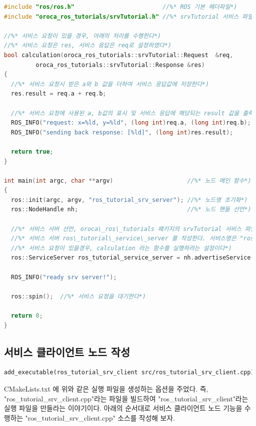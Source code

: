\begin{lstlisting}[language=C++]
#include "ros/ros.h"                         //%* ROS 기본 헤더파일*)
#include "oroca_ros_tutorials/srvTutorial.h" //%* srvTutorial 서비스 파일 헤더*)

//%* 서비스 요청이 있을 경우, 아래의 처리를 수행한다*)
//%* 서비스 요청은 res, 서비스 응답은 req로 설정하였다*)
bool calculation(oroca_ros_tutorials::srvTutorial::Request  &req,
         oroca_ros_tutorials::srvTutorial::Response &res)
{
  //%* 서비스 요청시 받은 a와 b 값을 더하여 서비스 응답값에 저장한다*)
  res.result = req.a + req.b;  

  //%* 서비스 요청에 사용된 a, b값의 표시 및 서비스 응답에 해당되는 result 값을 출력한다*)
  ROS_INFO("request: x=%ld, y=%ld", (long int)req.a, (long int)req.b);
  ROS_INFO("sending back response: [%ld]", (long int)res.result);

  return true;
}

int main(int argc, char **argv)                     //%* 노드 메인 함수*)
{
  ros::init(argc, argv, "ros_tutorial_srv_server"); //%* 노드명 초기화*)
  ros::NodeHandle nh;                               //%* 노드 핸들 선언*)

  //%* 서비스 서버 선언, oroca\_ros\_tutorials 패키지의 srvTutorial 서비스 파일을 이용한*)
  //%* 서비스 서버 ros\_tutorial\_service\_server 를 작성한다. 서비스명은 "ros\_tutorial\_srv" 이며,*)
  //%* 서비스 요청이 있을경우, calculation 라는 함수를 실행하라는 설정이다*)
  ros::ServiceServer ros_tutorial_service_server = nh.advertiseService("ros_tutorial_srv", calculation);

  ROS_INFO("ready srv server!");

  ros::spin();  //%* 서비스 요청을 대기한다*)

  return 0;
}
\end{lstlisting}

\subsection{서비스 클라이언트 노드 작성}

\begin{lstlisting}[language=make]
add_executable(ros_tutorial_srv_client src/ros_tutorial_srv_client.cpp)
\end{lstlisting}

CMakeLists.txt 에 위와 같은 실행 파일을 생성하는 옵션을 주었다. 즉, "ros\_tutorial\_srv\_client.cpp"라는 파일을 빌드하여 "ros\_tutorial\_srv\_client"라는 실행 파일을 만들라는 이야기이다. 아래의 순서대로 서비스 클라이언트 노드 기능을 수행하는 "ros\_tutorial\_srv\_client.cpp" 소스를 작성해 보자. 

